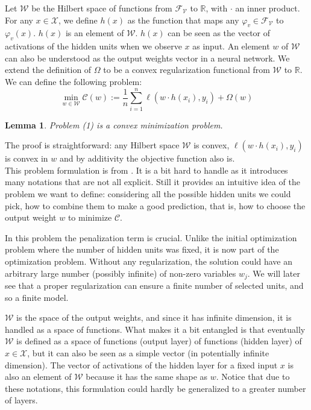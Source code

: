 \documentclass[a4paper, 11pt]{scrartcl}
\newtheorem{lemma}[theorem]{Lemma}
\begin{document}
{Let $\mathcal{W}$ be the Hilbert space of functions from $\mathcal{F}_\mathcal{V}$ to $\mathbb{R}$, with $\cdot$ an inner product. For any $x \in \mathcal{X}$, we define $h(x)$ as the function that maps any $\varphi_v \in \mathcal{F}_\mathcal{V}$ to $\varphi_v(x)$. $h(x)$ is an element of $\mathcal{W}$. $h(x)$ can be seen as the vector of activations of the hidden units when we observe $x$ as input. An element $w$ of $\mathcal{W}$ can also be understood as the output weights vector in a neural network. We extend the definition of $\Omega$ to be a convex regularization functional from $\mathcal{W}$ to $\mathbb{R}$.  \\

We can define the following problem:
\begin{equation}
\min_{w \in \mathcal{W}} \mathcal{C}(w) := \frac{1}{n} \sum_{i=1}^n \ell(w \cdot h(x_i), y_i) + \Omega(w)
\end{equation}

\begin{lemma}
Problem (1) is a convex minimization problem.
\end{lemma}
The proof is straightforward: any Hilbert space $\mathcal{W}$ is convex, $ \ell(w \cdot h(x_i), y_i)$ is convex in $w$ and by additivity the objective function also is.\\

This problem formulation is from \cite{bengio2006convex}. It is a bit hard to handle as it introduces many notations that are not all explicit. Still it provides an intuitive idea of the problem we want to define: considering all the possible hidden units we could pick, how to combine them to make a good prediction, that is, how to choose the output weight $w$ to minimize $\mathcal{C}$. 

In this problem the penalization term is crucial. Unlike the initial optimization problem where the number of hidden units was fixed, it is now part of the optimization problem. Without any regularization, the solution could have an arbitrary large number (possibly infinite) of non-zero variables $w_j$. We will later see that a proper regularization can ensure a finite number of selected units, and so a finite model.

$\mathcal{W}$ is the space of the output weights, and since it has infinite dimension, it is handled as a space of functions. What makes it a bit entangled is that eventually $\mathcal{W}$ is defined as a space of functions (output layer) of functions (hidden layer) of $x\in \mathcal{X}$, but it can also be seen as a simple vector (in potentially infinite dimension). The vector of activations of the hidden layer for a fixed input $x$ is also an element of $\mathcal{W}$ because it has the same shape as $w$. Notice that due to these notations, this formulation could hardly be generalized to a greater number of layers.\\

}
\end{document}

